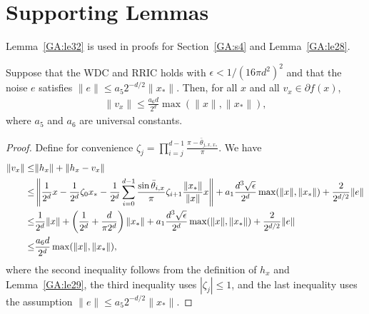 


\appendix

\section{Supporting Lemmas}

Lemma~\ref{GA:le32} is used in proofs for Section~\ref{GA:s4} and Lemma~\ref{GA:le28}.
\begin{lemma} \label{GA:le32}
Suppose that the WDC and RRIC holds with $\epsilon < 1/(16 \pi d^2)^2$ and that the noise $e$ satisfies $\|e\| \leq a_5 2^{-d/2} \|x_*\|$. Then, for all $x$ and all $v_x \in \partial f(x)$,
\begin{align} \label{GA:e23}
\|{v}_x\|
\leq
\frac{a_6 d}{2^d} \max(\|x\|, \|x_*\|),
\end{align}
where $a_5$ and $a_6$ are universal constants.
\end{lemma}
\begin{proof}
Define for convenience $\zeta_j=\prod_{i = j}^{d - 1} \frac{\pi - \bar{\theta}_{j, x, x_*}}{\pi}$.
We have
\begin{align}
\|{v}_x\|
\leq&
\|h_{x}\| + \|h_{x} - {v}_x\| \nonumber \\
\leq&
\left\|\frac{1}{2^d} x - \frac{1}{2^d} \zeta_{0} x_* - \frac{1}{2^d} \sum_{i = 0}^{d - 1} \frac{\sin \bar{\theta}_{i,x}}{\pi} \zeta_{i + 1}  \frac{\|x_*\|}{\|x\|} x \right\|
+
a_1 \frac{d^3 \sqrt{\epsilon}}{2^d} \max ( \|x\|, \| x_* \|)
+
\frac{2}{2^{d/2}} \|e\|
\nonumber \\
\leq&
\frac{1}{2^d} \|x\| + \left( \frac{1}{2^d}  + \frac{d}{\pi 2^d} \right) \|x_*\| + a_1 \frac{d^3 \sqrt{\epsilon}}{2^d} \max(\|x\|, \|x_*\|) + \frac{2}{2^{d/2}} \|e\| \nonumber \\
\leq&
\frac{a_6 d}{2^d} \max(\|x\|, \|x_*\|), \nonumber
\end{align}
where the second inequality follows from the definition of $h_x$ and Lemma~\ref{GA:le29}, the third inequality uses $| \zeta_j | \leq 1$,
and the last inequality uses the assumption $\|e\| \leq a_5 2^{-d/2} \|x_*\|$.
\end{proof}

